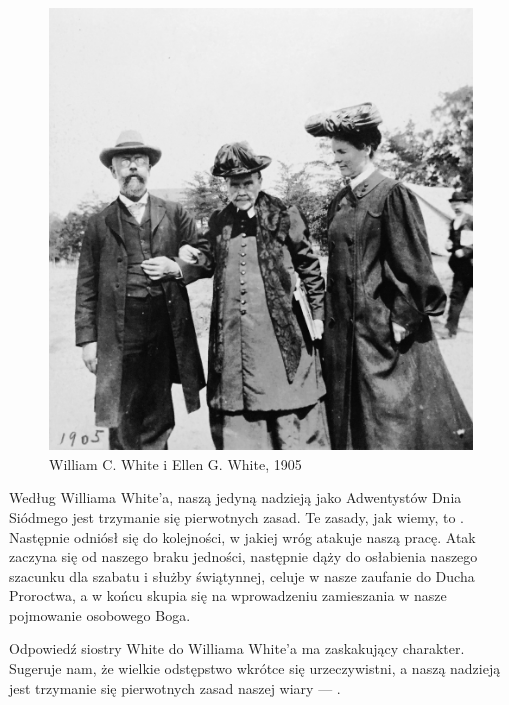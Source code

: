 \begin{figure}
    \centering
    \includegraphics[width=1\linewidth]{images/william-ellen-white-1905.jpg}
    \caption*{William C. White i Ellen G. White, 1905}
    \label{fig:w-e-white}
\end{figure}

Według Williama White'a, naszą jedyną nadzieją jako Adwentystów Dnia Siódmego jest trzymanie się pierwotnych zasad. Te zasady, jak wiemy, to . Następnie odniósł się do kolejności, w jakiej wróg atakuje naszą pracę. Atak zaczyna się od naszego braku jedności, następnie dąży do osłabienia naszego szacunku dla szabatu i służby świątynnej, celuje w nasze zaufanie do Ducha Proroctwa, a w końcu skupia się na wprowadzeniu zamieszania w nasze pojmowanie osobowego Boga.

Odpowiedź siostry White do Williama White'a ma zaskakujący charakter. Sugeruje nam, że wielkie odstępstwo wkrótce się urzeczywistni, a naszą nadzieją jest trzymanie się pierwotnych zasad naszej wiary — .

 \\
 \\
 \\

